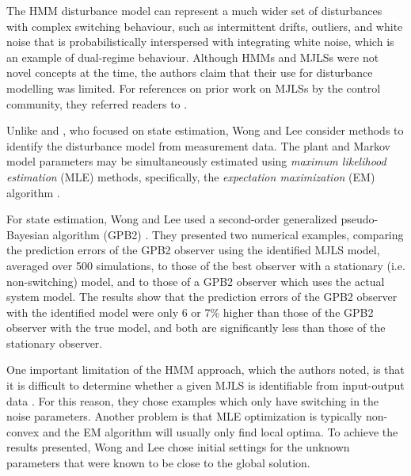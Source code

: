 
The \gls{HMM} disturbance model can represent a much wider set of disturbances with complex switching behaviour, such as intermittent drifts, outliers, and white noise that is probabilistically interspersed with integrating white noise, which is an example of dual-regime behaviour. Although \gls{HMM}s and \gls{MJLS}s were not novel concepts at the time, the authors claim that their use for disturbance modelling was limited. For references on prior work on \gls{MJLS}s by the control community, they referred readers to \cite{costa_discrete-time_2005}.

Unlike \cite{robertson_detection_1995} and \cite{eriksson_classification_1996}, who focused on state estimation, Wong and Lee consider methods to identify the disturbance model from measurement data. The plant and Markov model parameters may be simultaneously estimated using \textit{maximum likelihood estimation} (\gls{MLE}) methods, specifically, the \textit{expectation maximization} (EM) algorithm \citep{dempster_maximum_1977}.

For state estimation, Wong and Lee used a second-order generalized pseudo-Bayesian algorithm (\gls{GPB2})  \citep{bar-shalom_estimation_1993}. They presented two numerical examples, comparing the prediction errors of the \gls{GPB2} observer using the identified \gls{MJLS} model, averaged over 500 simulations, to those of the best observer with a stationary (i.e. non-switching) model, and to those of a \gls{GPB2} observer which uses the actual system model.  The results show that the prediction errors of the \gls{GPB2} observer with the identified model were only 6 or 7\% higher than those of the \gls{GPB2} observer with the true model, and both are significantly less than those of the stationary observer.

One important limitation of the \gls{HMM} approach, which the authors noted, is that it is difficult to determine whether a given \gls{MJLS} is identifiable from input-output data \citep{vidal_observability_2002}. For this reason, they chose examples which only have switching in the noise parameters. Another problem is that \gls{MLE} optimization is typically non-convex and the \gls{EM} algorithm will usually only find local optima. To achieve the results presented, Wong and Lee chose initial settings for the unknown parameters that were known to be close to the global solution.

